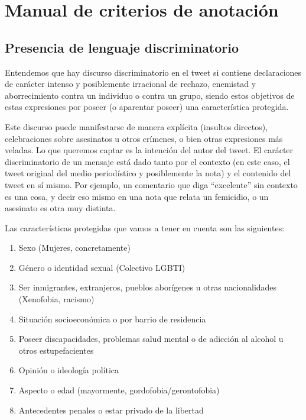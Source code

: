 \section{Manual de criterios de anotación}
\label{app:manual_criterios_anotacion}
\subsection{Presencia de lenguaje discriminatorio}

Entendemos que hay discurso discriminatorio en el tweet si contiene declaraciones de carácter intenso y posiblemente irracional de rechazo, enemistad y aborrecimiento contra un individuo o contra un grupo, siendo estos objetivos de estas expresiones por poseer (o aparentar poseer) una característica protegida.

Este discurso puede manifestarse de manera explícita (insultos directos), celebraciones sobre asesinatos u otros crímenes, o bien otras expresiones más veladas. Lo que queremos captar es la intención del autor del tweet. El carácter discriminatorio de un mensaje está dado tanto por el contexto (en este caso, el tweet original del medio periodístico y posiblemente la nota) y el contenido del tweet en sí mismo. Por ejemplo, un comentario que diga ``excelente'' sin contexto es una cosa, y decir eso mismo en una nota que relata un femicidio, o un asesinato es otra muy distinta.

Las características protegidas que vamos a tener en cuenta son las siguientes:

\begin{enumerate}
\item Sexo (Mujeres, concretamente)
\item Género o identidad sexual (Colectivo LGBTI)
\item Ser inmigrantes, extranjeros, pueblos aborígenes u otras nacionalidades (Xenofobia, racismo)
\item Situación socioeconómica o por barrio de residencia
\item Poseer discapacidades, problemas salud mental o de adicción al alcohol u otros estupefacientes
\item Opinión o ideología política
\item Aspecto o edad (mayormente, gordofobia/gerontofobia)
\item Antecedentes penales o estar privado de la libertad

\end{enumerate}

